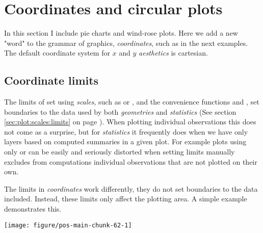 \documentclass[krantz2]{krantz}\usepackage{knitr}%
\begin{document}
\section{Coordinates and circular plots}

In this section I include pie charts and wind-rose plots. Here we add a new "word" to the grammar of graphics, \textit{coordinates}, such as  in the next examples. The default coordinate system for $x$ and $y$ \textit{aesthetics} is cartesian.

\subsection{Coordinate limits}\label{sec:plot:coord:limits}

The limits of set using \emph{scales}, such as  or , and the convenience functions  and , set boundaries to the data used by both \emph{geometries} and \emph{statistics} (See section \ref{sec:plot:scales:limits} on page \pageref{sec:plot:scales:limits}). When plotting individual observations this does not come as a surprise, but for \emph{statistics} it frequently does when we have only layers based on computed summaries in a given plot. For example plots using only  or  can be easily and seriously distorted when setting limits manually excludes from computations individual observations that are not plotted on their own.

The limits in \emph{coordinates} work differently, they do not set boundaries to the data included. Instead, these limits only affect the plotting area. A simple example demonstrates this.

\begin{knitrout}\footnotesize
{}\color{fgcolor}\begin{kframe}
\begin{alltt}
\hlstd{(}\hlstd{)}
 \hlkwb{<-} \hlstd{(} \hlstd{=} \hlopt{:}\hlstd{,}  \hlstd{= (}\hlopt{:}\hlstd{)}\hlopt{^} \hlopt{+} \hlstd{(}\hlstd{))}
 \hlkwb{<-}   \hlopt{+}
       \hlstd{()} \hlopt{+}
       \hlstd{(} \hlstd{=} \hlstd{)}
\end{alltt}
\end{kframe}

{\centering \texttt{[image: figure/pos-main-chunk-62-1]} 

}



\end{knitrout}
\end{document}
